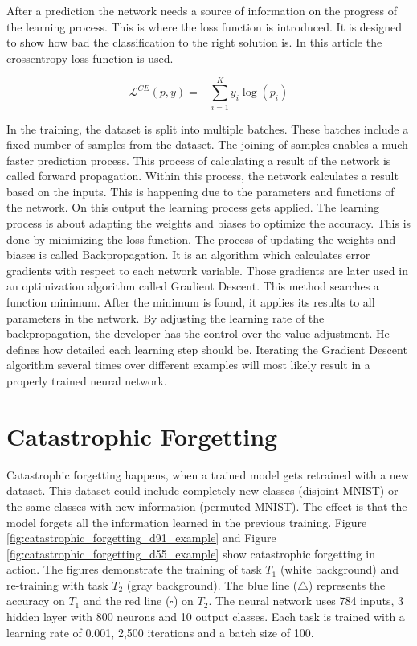 After a prediction the network needs a source of information on the progress of the learning process.
This is where the loss function is introduced.
It is designed to show how bad the classification to the right solution is.
In this article the crossentropy loss function is used.
\cite{math_nn_skalski, medium_nn_from_scratch}

\begin{equation}
    \mathcal{L}^{CE}(p,y) = -\sum_{i=1}^K y_i \log(p_i)
\end{equation}

In the training, the dataset is split into multiple batches.
These batches include a fixed number of samples from the dataset.
The joining of samples enables a much faster prediction process.
This process of calculating a result of the network is called forward propagation.
Within this process, the network calculates a result based on the inputs.
This is happening due to the parameters and functions of the network.
On this output the learning process gets applied.
\cite{math_nn_skalski, medium_nn_from_scratch}
\newline
The learning process is about adapting the weights and biases to optimize the accuracy.
This is done by minimizing the loss function.
The process of updating the weights and biases is called Backpropagation.
It is an algorithm which calculates error gradients with respect to each network variable.
Those gradients are later used in an optimization algorithm called Gradient Descent.
This method searches a function minimum.
After the minimum is found, it applies its results to all parameters in the network.
By adjusting the learning rate of the backpropagation, the developer has the control over the value adjustment.
He defines how detailed each learning step should be.
\cite{math_nn_andrey}
\newline
Iterating the Gradient Descent algorithm several times over different examples will most likely result in a properly trained neural network.

\section{Catastrophic Forgetting}
\label{catastrophic_forgetting}

Catastrophic forgetting happens, when a trained model gets retrained with a new dataset.
This dataset could include completely new classes (disjoint MNIST) or the same classes with new information (permuted MNIST).
The effect is that the model forgets all the information learned in the previous training.
\newline
Figure \ref{fig:catastrophic_forgetting_d91_example} and Figure \ref{fig:catastrophic_forgetting_d55_example} show catastrophic forgetting in action.
The figures demonstrate the training of task $T_1$ (white background) and re-training with task $T_2$ (gray background).
The blue line ($\triangle$) represents the accuracy on $T_1$ and the red line ($\square$) on $T_2$.
\newline
The neural network uses 784 inputs, 3 hidden layer with 800 neurons and 10 output classes.
Each task is trained with a learning rate of 0.001, 2,500 iterations and a batch size of 100.

